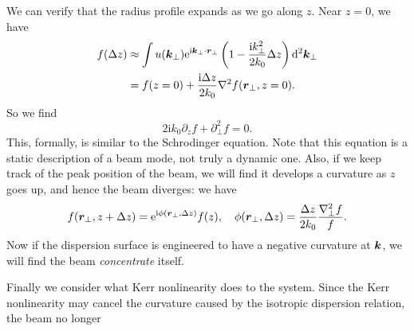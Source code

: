 \documentclass[hyperref, a4paper]{article}
\newcommand*{\ii}{\mathrm{i}}
\newcommand*{\ee}{\mathrm{e}}
\begin{document}
We can verify that the radius profile expands as we go along $z$.
Near $z = 0$, we have 
\begin{equation}
    \begin{aligned}
        f(\Delta z) &\approx \int u(\vb*{k}_\bot) \ee^{\ii \vb*{k}_\bot \cdot \vb*{r}_\bot}
        \left(
            1 - \frac{\ii k_\bot^2}{2k_0} \Delta z
        \right) \dd[2]{\vb*{k}_\bot} \\
        &= f(z=0) + \frac{\ii \Delta z}{2 k_0} \laplacian f(\vb*{r}_\bot, z = 0).
    \end{aligned}
\end{equation}
So we find 
\begin{equation}
    2 \ii k_0 \partial_z f + \partial_{\bot}^2 f = 0.
\end{equation}
This, formally, is similar to the Schrodinger equation.
Note that this equation is a static description of a beam mode, 
not truly a dynamic one.
Also, if we keep track of the peak position of the beam, 
we will find it develops a curvature as $z$ goes up, 
and hence the beam diverges:
we have 
\begin{equation}
    f(\vb*{r}_\bot, z + \Delta z) = \ee^{\ii \phi(\vb*{r}_\bot, \Delta z)} f(z), \quad 
    \phi(\vb*{r}_\bot, \Delta z) = \frac{\Delta z}{2 k_0} \frac{\laplacian_\bot f}{f}.
\end{equation}
Now if the dispersion surface is engineered to have a negative curvature at $\vb*{k}$, 
we will find the beam \emph{concentrate} itself.

Finally we consider what Kerr nonlinearity does to the system.
Since the Kerr nonlinearity may cancel the curvature caused by the isotropic dispersion relation,
the beam no longer 
\end{document}
